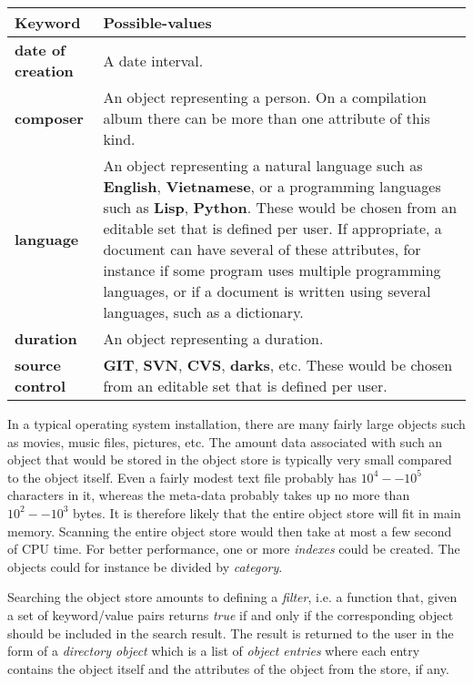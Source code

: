 \begin{tabularx}{\linewidth}%
{|>{\setlength\hsize{.2\hsize}}X|%
  >{\setlength\hsize{.8\hsize}}X|}
\hline
Keyword & Possible-values\\
\hline\hline
\textbf{date of creation} &

A date interval.\\
\hline
\textbf{composer} &

An object representing a person.  On a compilation album there
can be more than one attribute of this kind. \\
\hline
\textbf{language} &

An object representing a natural language such
as \textbf{English}, \textbf{Vietnamese}, or a programming languages
such as \textbf{Lisp}, \textbf{Python}. These would
be chosen from an editable set that is defined per user.  If
appropriate, a document can have several of these attributes, for
instance if some program uses multiple programming languages, or
if a document is written using several languages, such as a
dictionary. \\
\hline
\textbf{duration} &

An object representing a duration. \\
\hline
\textbf{source control} &
 
\textbf{GIT}, \textbf{SVN}, \textbf{CVS}, \textbf{darks}, etc.  These
would be chosen from an editable set that is defined per user.\\
\hline
\end{tabularx}

In a typical operating system installation, there are many fairly
large objects such as movies, music files, pictures, etc.  The amount
data associated with such an object that would be stored in the object
store is typically very small compared to the object itself.  Even a
fairly modest text file probably has $10^4 -- 10^5$ characters in it,
whereas the meta-data probably takes up no more than $10^2 -- 10^3$
bytes.  It is therefore likely that the entire object store will fit
in main memory.  Scanning the entire object store would then take at
most a few second of CPU time.  For better performance, one or more
\emph{indexes} could be created.  The objects could for instance be
divided by \emph{category}.

Searching the object store amounts to defining a \emph{filter},
i.e. a function that, given a set of keyword/value pairs returns
\emph{true} if and only if the corresponding object should be included
in the search result.  The result is returned to the user in the form
of a \emph{directory object} which is a list of \emph{object entries}
where each entry contains the object itself and the attributes of the
object from the store, if any.
